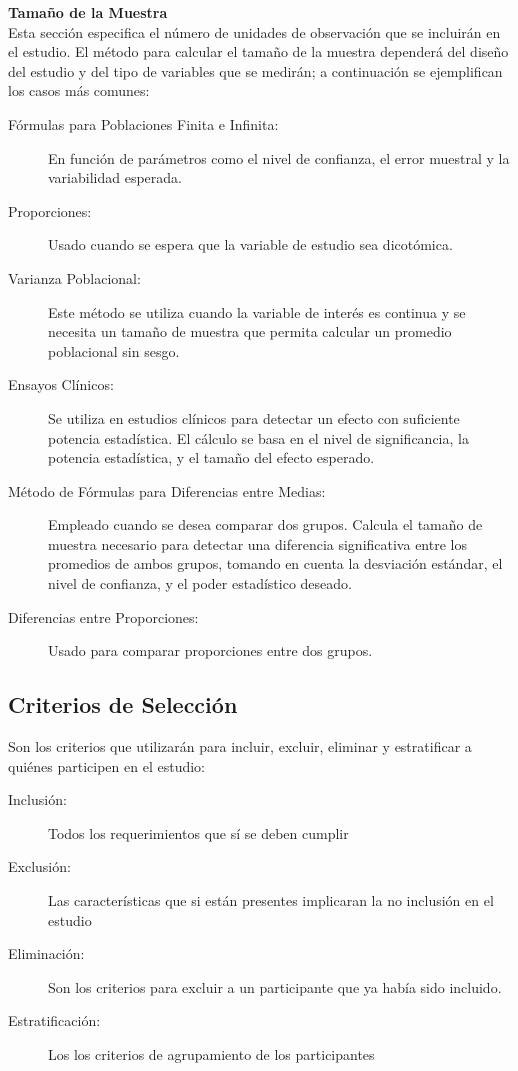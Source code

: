 \documentclass[12pt,letterpaper,spanish, twoside]{article}
\begin{document}
\textbf{Tamaño de la Muestra} \\
Esta sección especifica el número de unidades de observación que se incluirán en el estudio. El método para calcular el tamaño de la muestra dependerá del diseño del estudio y del tipo de variables que se medirán; a continuación se ejemplifican los casos más comunes:
\begin{description}
    \item[Fórmulas para Poblaciones Finita e Infinita:]  En función de parámetros como el nivel de confianza, el error muestral y la variabilidad esperada.

    \item[Proporciones:] Usado cuando se espera que la variable de estudio sea dicotómica.

    \item[Varianza Poblacional:] Este método se utiliza cuando la variable de interés es continua y se necesita un tamaño de muestra que permita calcular un promedio poblacional sin sesgo.

    \item[Ensayos Clínicos:] Se utiliza en estudios clínicos para detectar un efecto con suficiente potencia estadística. El cálculo se basa en el nivel de significancia, la potencia estadística, y el tamaño del efecto esperado.

    \item[Método de Fórmulas para Diferencias entre Medias:] Empleado cuando se desea comparar dos grupos. Calcula el tamaño de muestra necesario para detectar una diferencia significativa entre los promedios de ambos grupos, tomando en cuenta la desviación estándar, el nivel de confianza, y el poder estadístico deseado.

    \item[Diferencias entre Proporciones:] Usado para comparar proporciones entre dos grupos.
\end{description}

\subsection{Criterios de Selección}
Son los criterios que utilizarán para incluir, excluir, eliminar y estratificar a quiénes participen en el estudio:
\begin{description}
 \item[Inclusión:] Todos los requerimientos que sí se deben cumplir
 \item[Exclusión:] Las características que si están presentes implicaran la no inclusión en el estudio
 \item[Eliminación:] Son los criterios para excluir a un participante que ya había sido incluido.
 \item[Estratificación:] Los los criterios de agrupamiento de los participantes
\end{description}
\end{document}
